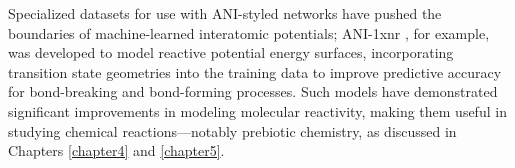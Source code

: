 Specialized datasets for use with ANI-styled networks have pushed the boundaries of machine-learned interatomic potentials; ANI-1xnr \cite{ani-1xnr}, for example, was developed to model reactive potential energy surfaces, incorporating transition state geometries into the training data to improve predictive accuracy for bond-breaking and bond-forming processes.
Such models have demonstrated significant improvements in modeling molecular reactivity, making them useful in studying chemical reactions---notably prebiotic chemistry, as discussed in Chapters \ref{chapter4} and \ref{chapter5}.



